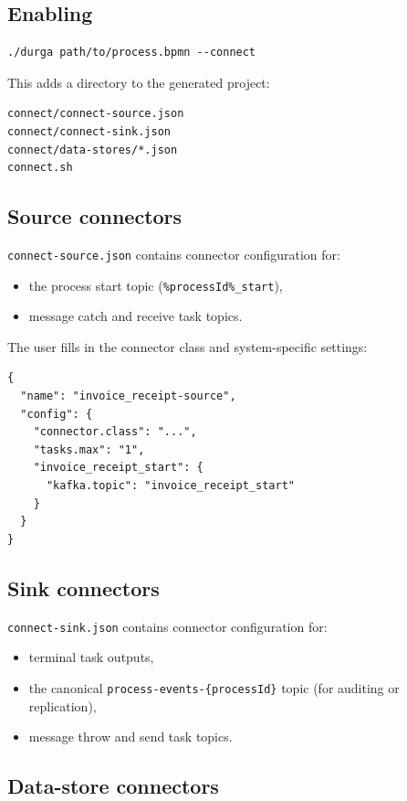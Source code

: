 \subsection{Enabling}

\begin{verbatim}
./durga path/to/process.bpmn --connect
\end{verbatim}

This adds a  directory to the generated project:

\begin{verbatim}
connect/connect-source.json
connect/connect-sink.json
connect/data-stores/*.json
connect.sh
\end{verbatim}

\subsection{Source connectors}

\texttt{connect-source.json} contains connector configuration for:
\begin{itemize}
\item the process start topic (\texttt{\%processId\%\_start}),
\item message catch and receive task topics.
\end{itemize}

The user fills in the connector class and system-specific settings:

\begin{verbatim}
{
  "name": "invoice_receipt-source",
  "config": {
    "connector.class": "...",
    "tasks.max": "1",
    "invoice_receipt_start": {
      "kafka.topic": "invoice_receipt_start"
    }
  }
}
\end{verbatim}

\subsection{Sink connectors}

\texttt{connect-sink.json} contains connector configuration for:
\begin{itemize}
\item terminal task outputs,
\item the canonical \texttt{process-events-\{processId\}} topic (for auditing or replication),
\item message throw and send task topics.
\end{itemize}

\subsection{Data-store connectors}

